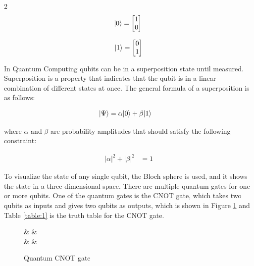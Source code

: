 \documentclass[12pt,a4paper]{article}
\DeclarePairedDelimiter\ket{\lvert}{\rangle}
\begin{document}
	\begin{multicols}{2}
		\begin{equation*}
			\ket{0} = \begin{bmatrix}
				1 \\ 0
			\end{bmatrix}\\
		\end{equation*}
		
		\begin{equation*}
			\ket{1} = \begin{bmatrix}
				0 \\ 1
			\end{bmatrix}
		\end{equation*}
	\end{multicols}
	
	In Quantum Computing qubits can be in a superposition state until measured. Superposition is a property that indicates that the qubit is in a linear combination of different states at once. The general formula of a superposition is as follows:
	
	\begin{align*}
		\ket{\Psi} &= \alpha\ket{0} + \beta\ket{1} 
	\end{align*}
	
	where $\alpha$ and $\beta$ are probability amplitudes that should satisfy the following constraint:
	
	\begin{align*}
		|\alpha|^2 + |\beta|^2 &= 1
	\end{align*}
	
	To visualize the state of any single qubit, the Bloch sphere is used, and it shows the state in a three dimensional space. There are multiple quantum gates for one or more qubits. One of the quantum gates is the CNOT gate, which takes two qubits as inputs and gives two qubits as outputs, which is shown in Figure \ref{fig:1} and Table \ref{table:1} is the truth table for the CNOT gate.
	
	\begin{figure}[H]
		\centering
		\begin{quantikz}[row sep={9mm,between origins}]
			 &  &  \\
			 & \targ{} &  \oplus {}
		\end{quantikz}
		\caption{Quantum CNOT gate}
		\label{fig:1}
	\end{figure}
	
\end{document}
